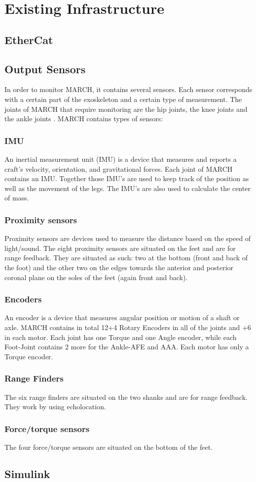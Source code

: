 \section{Existing Infrastructure}
\subsection{EtherCat}

\subsection{Output Sensors}
In order to monitor MARCH, it contains several sensors. Each sensor corresponds with a certain part of the exoskeleton and a certain type of measurement. The joints of MARCH that require monitoring are the hip joints, the knee joints and the ankle joints . MARCH contains  types of sensors:
\subsubsection{IMU}
An inertial measurement unit (IMU) is a device that measures and reports a craft's velocity, orientation, and gravitational forces. Each joint of MARCH contains an IMU. Together those IMU's are used to keep track of the position as well as the movement of the legs. The IMU's are also used to calculate the center of mass. 
\subsubsection{Proximity sensors}
Proximity sensors are devices used to measure the distance based on the speed of light/sound. The eight proximity sensors are situated on the feet and are for range feedback. They are situated as such: two at the bottom (front and back of the foot) and the other two on the edges towards the anterior and posterior coronal plane on the soles of the feet (again front and back). 

\subsubsection{Encoders}
An encoder is a device that measures angular position or motion of a shaft or axle. MARCH contains in total 12+4 Rotary Encoders in all of the joints and +6 in each motor. Each joint has one Torque and one Angle encoder, while each Foot-Joint contains 2 more for the Ankle-AFE and AAA. Each motor has only a Torque encoder.
\subsubsection{Range Finders}
The six range finders are situated on the two shanks and are for range feedback. They work by using echolocation.
\subsubsection{Force/torque sensors}
The four force/torque sensors are situated on the bottom of the feet.

\subsection{Simulink}